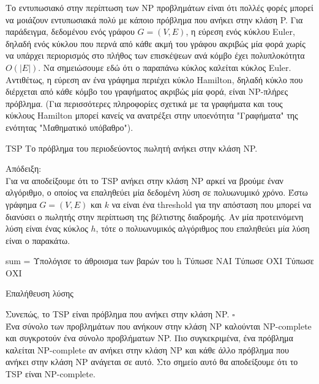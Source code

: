 \documentclass[oneside,12pt]{book}
\theoremstyle{definition}
\begin{document}
Το εντυπωσιακό στην περίπτωση των NP προβλημάτων είναι ότι πολλές φορές μπορεί να μοιάζουν εντυπωσιακά πολύ με κάποιο πρόβλημα που ανήκει στην κλάση P. Για παράδειγμα, δεδομένου ενός γράφου \(G = (V,E)\), η εύρεση ενός κύκλου Euler, δηλαδή ενός κύκλου που περνά από κάθε ακμή του γράφου ακριβώς μία φορά χωρίς να υπάρχει περιορισμός στο πλήθος των επισκέψεων ανά κόμβο έχει πολυπλοκότητα \(Ο(|Ε|)\). Να σημειώσουμε εδώ ότι ο παραπάνω κύκλος καλείται κύκλος Euler. Αντιθέτως, η εύρεση αν ένα γράφημα περιέχει κύκλο Hamilton, δηλαδή κύκλο που διέρχεται από κάθε κόμβο του γραφήματος ακριβώς μία φορά, είναι NP-πλήρες πρόβλημα. (Για περισσότερες πληροφορίες σχετικά με τα γραφήματα και τους κύκλους Hamilton μπορεί κανείς να ανατρέξει στην υποενότητα "Γραφήματα" της ενότητας "Μαθηματικό υπόβαθρο"). \\

\begin{mylemma}{TSP}{}
	Tο πρόβλημα του περιοδεύοντος πωλητή ανήκει στην κλάση NP.
\end{mylemma}

Απόδειξη: \\
Για να αποδείξουμε ότι το TSP ανήκει στην κλάση NP αρκεί να βρούμε έναν αλγόριθμο, ο οποίος να επαληθεύει μία δεδομένη λύση σε πολυωνυμικό χρόνο. Έστω γράφημα \(G = (V,E)\) και \(k\) να είναι ένα threshold για την απόσταση που μπορεί να διανύσει ο πωλητής στην περίπτωση της βέλτιστης διαδρομής. Αν μία προτεινόμενη λύση είναι ένας κύκλος \(h\), τότε ο πολυωνυμικός αλγόριθμος που επαληθεύει μία λύση είναι ο παρακάτω.

\begin{algorithm}[H]
	\SetAlgoLined

	{
		sum = Υπολόγισε το άθροισμα των βαρών του h \;
		{
			Τύπωσε ΝΑΙ \;
		}
		\Else
		{
			Τύπωσε ΟΧΙ \;}
		}
	\Else
	{
		Τύπωσε ΟΧΙ \;
	}

	\caption{Επαλήθευση λύσης}
\end{algorithm}

Συνεπώς, το TSP είναι πρόβλημα που ανήκει στην κλάση NP. \(\square\) \\

Ένα σύνολο των προβλημάτων που ανήκουν στην κλάση NP καλούνται NP-complete και συγκροτούν ένα σύνολο προβλήματων NP. Πιο συγκεκριμένα, ένα πρόβλημα καλείται NP-complete αν ανήκει στην κλάση NP και κάθε άλλο πρόβλημα που ανήκει στην κλάση NP ανάγεται σε αυτό. Στο σημείο αυτό θα αποδείξουμε ότι το TSP είναι NP-complete. \\
\end{document}
